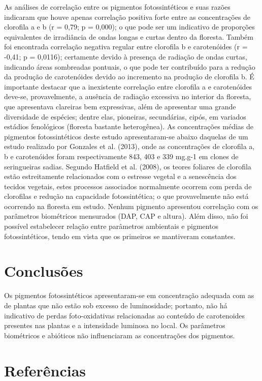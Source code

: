 \documentclass[article,12pt,onesidea,4paper,english,brazil]{abntex2}
\begin{document}
	As análises de correlação entre os pigmentos fotossintéticos e suas razões indicaram que houve apenas correlação positiva forte entre as concentrações de clorofila a e b (r = 0,79; p = 0,000); o que pode ser um indicativo de proporções equivalentes de irradiância de ondas longas e curtas dentro da floresta. Também foi encontrada correlação negativa regular entre clorofila b e carotenóides (r = -0,41; p = 0,0116); certamente devido à presença de radiação de ondas curtas, indicando áreas sombreadas pontuais, o que pode ter contribuído para a redução da produção de carotenóides devido ao incremento na produção de clorofila b.
	É importante destacar que a inexistente correlação entre clorofila a e carotenóides deve-se, provavelmente, a ausência de radiação excessiva no interior da floresta, que apresentava clareiras bem expressivas, além de apresentar uma grande diversidade de espécies; dentre elas, pioneiras, secundárias, cipós, em variados estádios fenológicos (floresta bastante heterogênea).
	As concentrações médias de pigmentos fotossintéticos deste estudo apresentaram-se abaixo daquelas de um estudo realizado por Gonzales et al. (2013), onde as concentrações de clorofila a, b e carotenóides foram respectivamente 843, 403 e 339 mg.g-1 em clones de seringueiras sadias. Segundo Hatfield et al. (2008), os teores foliares de clorofila estão estreitamente relacionados com o estresse vegetal e a senescência dos tecidos vegetais, estes processos associados normalmente ocorrem com perda de clorofilas e redução na capacidade fotossintética; o que provavelmente não está ocorrendo na floresta em estudo.
	Nenhum pigmento apresentou correlação com os parâmetros biométricos mensurados (DAP, CAP e altura). Além disso, não foi possível estabelecer relação entre parâmetros ambientais e pigmentos fotossintéticos, tendo em vista que os primeiros se mantiveram constantes.
	
	\section*{Conclusões}
	
Os pigmentos fotossintéticos apresentaram-se em concentração adequada com as de plantas que não estão sob excesso de luminosidade; portanto, não há indicativo de perdas foto-oxidativas relacionadas ao conteúdo de carotenoides presentes nas plantas e a intensidade luminosa no local. Os parâmetros biométricos e abióticos não influenciaram as concentrações dos pigmentos.
	
	\sloppy
	\section*{Referências}
	
\end{document}
